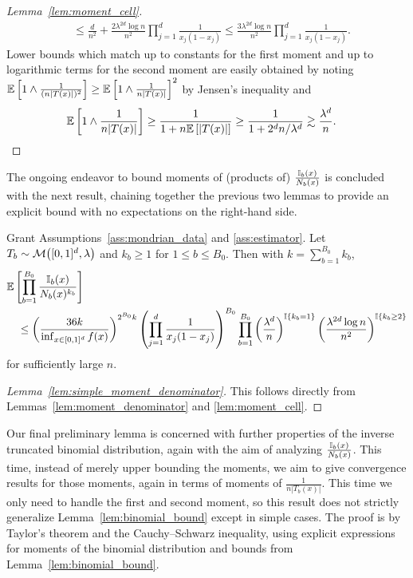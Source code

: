 \begin{proof}[Lemma~\ref{lem:moment_cell}]
\begin{align*}
    &\leq
    \frac{d}{n^2}
    + \frac{2 \lambda^{2d} \log n}{n^2}
    \prod_{j=1}^d
    \frac{1}{x_j(1-x_j)}
    \leq
    \frac{3 \lambda^{2d} \log n}{n^2}
    \prod_{j=1}^d
    \frac{1}{x_j(1-x_j)}.
  \end{align*}
  Lower bounds which match up to
  constants for the first moment
  and up to logarithmic terms for the second moment
  are easily obtained by noting
  $\mathbb{E} \left[ 1 \wedge \frac{1}{(n|T(x)|)^2} \right]
  \geq \mathbb{E} \left[ 1 \wedge \frac{1}{n|T(x)|} \right]^2$
  by Jensen's inequality and
  \begin{align*}
    \mathbb{E} \left[ 1 \wedge \frac{1}{n|T(x)|} \right]
    &\geq \frac{1}{1 + n \mathbb{E} \left[ |T(x)| \right]}
    \geq \frac{1}{1 + 2^d n / \lambda^d}
    \gtrsim \frac{\lambda^d}{n}.
  \end{align*}
\end{proof}

The ongoing endeavor to bound
moments of (products of) $\frac{\mathbb{I}_b(x)}{N_b(x)}$
is concluded with the next result,
chaining together the previous two lemmas to provide an
explicit bound with no expectations on the right-hand side.

\begin{lemma}%
  \label{lem:simple_moment_denominator}
  Grant Assumptions~\ref{ass:mondrian_data}
  and \ref{ass:estimator}.
  Let $T_b \sim \mathcal{M}\big([0,1]^d, \lambda\big)$
  and $k_b \geq 1$ for $1 \leq b \leq B_0$.
  Then with $k = \sum_{b=1}^{B_0} k_b$,
  \begin{align*}
    &\mathbb{E}\left[
      \prod_{b=1}^{B_0}
      \frac{\mathbb{I}_b(x)}{N_b(x)^{k_b}}
    \right] \\
    &\quad\leq
    \left( \frac{36k}{\inf_{x \in [0,1]^d} f(x)} \right)^{2^{B_0} k}
    \left(
      \prod_{j=1}^{d} \frac{1}{x_j (1-x_j)}
    \right)^{B_0}
    \prod_{b=1}^{B_0}
    \left(
      \frac{\lambda^d}{n}
    \right)^{\mathbb{I} \left\{ k_b = 1 \right\}}
    \left(
      \frac{\lambda^{2d} \log n}{n^2}
    \right)^{\mathbb{I} \left\{ k_b \geq 2 \right\}}
  \end{align*}
  for sufficiently large $n$.
\end{lemma}

\begin{proof}[Lemma~\ref{lem:simple_moment_denominator}]
  This follows directly from
  Lemmas~\ref{lem:moment_denominator} and \ref{lem:moment_cell}.
\end{proof}

Our final preliminary lemma is concerned with further properties of
the inverse truncated binomial distribution, again with the aim
of analyzing $\frac{\mathbb{I}_b(x)}{N_b(x)}$.
This time, instead of merely upper bounding the moments,
we aim to give convergence results for those moments,
again in terms of moments of $\frac{1}{n |T_b(x)|}$.
This time we only need to handle the first
and second moment, so this result does not strictly generalize
Lemma~\ref{lem:binomial_bound} except in simple cases.
The proof is by Taylor's theorem and the Cauchy--Schwarz inequality,
using explicit expressions for moments of the binomial distribution
and bounds from Lemma~\ref{lem:binomial_bound}.

